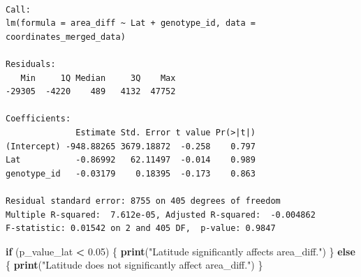 \documentclass[
  11pt,
]{article}
\newenvironment{Shaded}{\begin{snugshade}}{\end{snugshade}}
\newcommand{\AttributeTok}[1]{\textcolor[rgb]{0.13,0.29,0.53}{#1}}
\newcommand{\CommentTok}[1]{\textcolor[rgb]{0.56,0.35,0.01}{\textit{#1}}}
\newcommand{\ControlFlowTok}[1]{\textcolor[rgb]{0.13,0.29,0.53}{\textbf{#1}}}
\newcommand{\DecValTok}[1]{\textcolor[rgb]{0.00,0.00,0.81}{#1}}
\newcommand{\FloatTok}[1]{\textcolor[rgb]{0.00,0.00,0.81}{#1}}
\newcommand{\FunctionTok}[1]{\textcolor[rgb]{0.13,0.29,0.53}{\textbf{#1}}}
\newcommand{\NormalTok}[1]{#1}
\newcommand{\OtherTok}[1]{\textcolor[rgb]{0.56,0.35,0.01}{#1}}
\newcommand{\SpecialCharTok}[1]{\textcolor[rgb]{0.81,0.36,0.00}{\textbf{#1}}}
\newcommand{\StringTok}[1]{\textcolor[rgb]{0.31,0.60,0.02}{#1}}
\begin{document}
\begin{Shaded}
\end{Shaded}

\begin{verbatim}

Call:
lm(formula = area_diff ~ Lat + genotype_id, data = coordinates_merged_data)

Residuals:
   Min     1Q Median     3Q    Max 
-29305  -4220    489   4132  47752 

Coefficients:
              Estimate Std. Error t value Pr(>|t|)
(Intercept) -948.88265 3679.18872  -0.258    0.797
Lat           -0.86992   62.11497  -0.014    0.989
genotype_id   -0.03179    0.18395  -0.173    0.863

Residual standard error: 8755 on 405 degrees of freedom
Multiple R-squared:  7.612e-05, Adjusted R-squared:  -0.004862 
F-statistic: 0.01542 on 2 and 405 DF,  p-value: 0.9847
\end{verbatim}

\begin{Shaded}
\begin{Highlighting}[]
\ControlFlowTok{if}\NormalTok{ (p\_value\_lat }\SpecialCharTok{\textless{}} \FloatTok{0.05}\NormalTok{) \{}
    \FunctionTok{print}\NormalTok{(}\StringTok{"Latitude significantly affects area\_diff."}\NormalTok{)}
\NormalTok{\} }\ControlFlowTok{else}\NormalTok{ \{}
    \FunctionTok{print}\NormalTok{(}\StringTok{"Latitude does not significantly affect area\_diff."}\NormalTok{)}
\NormalTok{\}}
\end{Highlighting}
\end{Shaded}
\end{document}
